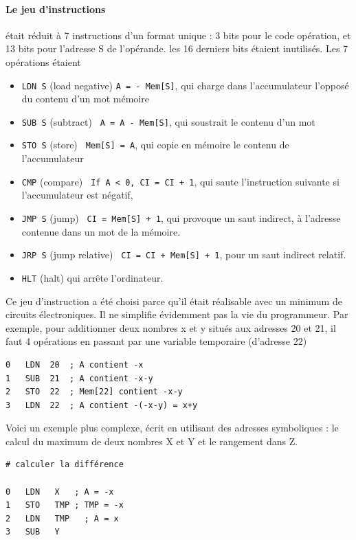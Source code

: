 \begin{multicols}{2}
\paragraph{Le jeu d'instructions} était réduit à 7 instructions d'un 
format unique : 
3 bits pour le code opération, et 13 bits pour l'adresse S de
l'opérande. les 16 derniers bits étaient inutilisés. Les 7 opérations
étaient

\begin{itemize}
\item \texttt{LDN S} (load negative) \verb/A = - Mem[S]/, qui charge
  dans l'accumulateur l'opposé du contenu d'un mot mémoire
\item \texttt{SUB S} (subtract) \verb/ A = A - Mem[S]/, qui soustrait
  le contenu d'un mot
\item \texttt{STO S} (store) \verb/ Mem[S] = A/, qui copie en mémoire
  le contenu de l'accumulateur
\item \texttt{CMP} (compare) \verb/ If A < 0, CI = CI + 1/, qui saute
  l'instruction suivante si l'accumulateur est négatif,
\item \texttt{JMP S} (jump) \verb/ CI = Mem[S] + 1/, qui provoque un
  saut indirect, à l'adresse contenue dans un mot de la mémoire.
\item \texttt{JRP S} (jump relative) \verb/ CI = CI + Mem[S] + 1/,
  pour un saut indirect relatif.
\item  \texttt{HLT} (halt) qui arrête l'ordinateur.
\end{itemize}

Ce jeu d'instruction a été choisi parce qu'il était réalisable avec un
minimum de circuits électroniques. Il ne simplifie évidemment pas la
vie du programmeur.  Par exemple, pour additionner deux nombres x et y
situés aux adresses 20 et 21, il faut 4 opérations en passant par une
variable temporaire (d'adresse 22)
\begin{verbatim}
0   LDN  20  ; A contient -x
1   SUB  21  ; A contient -x-y
2   STO  22  ; Mem[22] contient -x-y
3   LDN  22  ; A contient -(-x-y) = x+y
\end{verbatim}

Voici un exemple plus complexe, écrit en utilisant
des adresses symboliques : le calcul du maximum de
deux nombres X et Y et le rangement dans Z.


\begin{verbatim}
# calculer la différence

0   LDN   X   ; A = -x
1   STO   TMP ; TMP = -x
2   LDN   TMP   ; A = x
3   SUB   Y


\end{verbatim}
\end{multicols}
